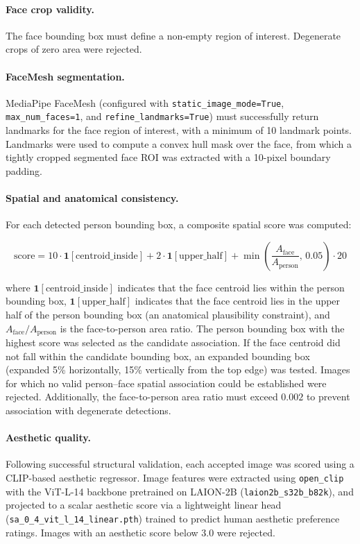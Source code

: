 \paragraph{Face crop validity.} The face bounding box must define a non-empty region of interest. Degenerate crops of zero area were rejected.

\paragraph{FaceMesh segmentation.} MediaPipe FaceMesh (configured with \texttt{static\_image\_mode=True}, \texttt{max\_num\_faces=1}, and \texttt{refine\_landmarks=True}) must successfully return landmarks for the face region of interest, with a minimum of 10 landmark points. Landmarks were used to compute a convex hull mask over the face, from which a tightly cropped segmented face ROI was extracted with a 10-pixel boundary padding.

\paragraph{Spatial and anatomical consistency.} For each detected person bounding box, a composite spatial score was computed:

\[
\text{score} = 10 \cdot \mathbf{1}[\text{centroid\_inside}] + 2 \cdot \mathbf{1}[\text{upper\_half}] + \min\!\left(\frac{A_\text{face}}{A_\text{person}},\, 0.05\right) \cdot 20
\]

where $\mathbf{1}[\text{centroid\_inside}]$ indicates that the face centroid lies within the person bounding box, $\mathbf{1}[\text{upper\_half}]$ indicates that the face centroid lies in the upper half of the person bounding box (an anatomical plausibility constraint), and $A_\text{face}/A_\text{person}$ is the face-to-person area ratio. The person bounding box with the highest score was selected as the candidate association. If the face centroid did not fall within the candidate bounding box, an expanded bounding box (expanded 5\% horizontally, 15\% vertically from the top edge) was tested. Images for which no valid person--face spatial association could be established were rejected. Additionally, the face-to-person area ratio must exceed $0.002$ to prevent association with degenerate detections.

\paragraph{Aesthetic quality.} Following successful structural validation, each accepted image was scored using a CLIP-based aesthetic regressor. Image features were extracted using \texttt{open\_clip} with the ViT-L-14 backbone pretrained on LAION-2B (\texttt{laion2b\_s32b\_b82k}), and projected to a scalar aesthetic score via a lightweight linear head (\texttt{sa\_0\_4\_vit\_l\_14\_linear.pth}) trained to predict human aesthetic preference ratings. Images with an aesthetic score below 3.0 were rejected.

